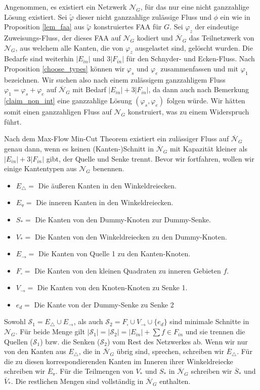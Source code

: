 Angenommen, es existiert ein Netzwerk $\mathcal{N}_G$, für das nur eine nicht ganzzahlige Lösung existiert. Sei $\tilde{\varphi}$ dieser nicht ganzzahlige zulässige Fluss und $\phi$ ein wie in Proposition \ref{lem_faa} aus $\tilde{\varphi}$ konstruiertes FAA für $G$. Sei $\varphi_z$ der eindeutige Zuweisungs-Fluss, der dieses FAA auf $\mathcal{N}_G$ kodiert und $\overline{\mathcal{N}}_G$ das Teilnetzwerk von $\mathcal{N}_G$, aus welchem alle Kanten, die von $\varphi_z$ ausgelastet sind, gelöscht wurden. Die Bedarfe sind weiterhin $|E_{in}|$ und $3|F_{in}|$ für den Schnyder- und Ecken-Fluss. Nach Proposition \ref{choose_types} können wir $\varphi_s$ und $\varphi_e$ zusammenfassen und mit $\varphi_1$ bezeichnen. Wir suchen also nach einem zulässigem ganzzahligem Fluss $\varphi_1 = \varphi_s + \varphi_e$ auf $\overline{\mathcal{N}}_G$ mit Bedarf $|E_{in}| + 3|F_{in}|$, da dann auch nach Bemerkung \ref{claim_non_int} eine ganzzahlige Lösung $(\varphi_s,\varphi_e)$ folgen würde. Wir hätten somit einen ganzzahligen Fluss auf $\mathcal{N}_G$ konstruiert, was zu einem Widerspruch führt.

Nach dem Max-Flow Min-Cut Theorem existiert ein zulässiger Fluss auf $\overline{\mathcal{N}}_G$ genau dann, wenn es keinen (Kanten-)Schnitt in $\overline{\mathcal{N}}_G$ mit Kapazität kleiner als $|E_{in}| + 3|F_{in}|$ gibt, der Quelle und Senke trennt. Bevor wir fortfahren, wollen wir einige Kantentypen aus $\mathcal{N}_G$ benennen.

\begin{itemize}
\item $E_\triangle = $ Die äußeren Kanten in den Winkeldreiecken.
\item $E_\triangledown = $ Die inneren Kanten in den Winkeldreiecken.
\item $S_* =$ Die Kanten von den Dummy-Knoten zur Dummy-Senke.
\item $V_* = $ Die Kanten von den Winkeldreiecken zu den Dummy-Knoten.
\item $E_{\to} = $ Die Kanten von Quelle 1 zu den Kanten-Knoten.
\item $F_\square = $ Die Kanten von den kleinen Quadraten zu inneren Gebieten $f$.
\item $V_{\to} = $ Die Kanten von den Knoten-Knoten zu Senke 1.
\item $e_{d} = $ Die Kante von der Dummy-Senke zu Senke 2
\end{itemize}

Sowohl $\mathcal{S}_1 = E_\triangle \cup E_{\to}$, als auch $\mathcal{S}_2 = F_\square \cup V_{\to} \cup \{e_{d}\}$ sind minimale Schnitte in $\mathcal{N}_G$. Für beide Menge gilt $|\mathcal{S}_1| = |\mathcal{S}_2| = |E_{in}| + \sum{f \in F_{in}}$ und sie trennen die Quellen ($\mathcal{S}_1$) bzw. die Senken ($\mathcal{S}_2$) vom Rest des Netzwerkes ab. Wenn wir nur von den Kanten aus $E_\triangle$, die in $\overline{\mathcal{N}}_G$ übrig sind, sprechen, schreiben wir $\overline{E}_\triangle$. Für die zu diesen korrespondierenden Kanten im Inneren ihrer Winkeldreiecke schreiben wir $\overline{E}_\triangledown$. Für die Teilmengen von $V_*$ und $S_*$ in $\overline{\mathcal{N}}_G$ schreiben wir $\overline{S}_*$ und $\overline{V}_*$. Die restlichen Mengen sind vollständig in $\overline{\mathcal{N}}_G$ enthalten.

